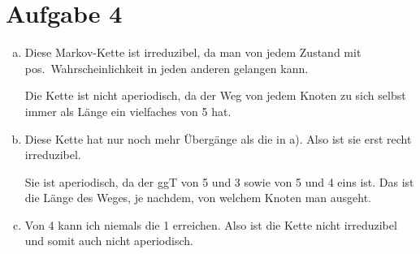 \documentclass[10pt,a4paper,parskip=half]{scrartcl}
\begin{document}
\section*{Aufgabe 4}
\begin{enumerate}[a)]
\item Diese Markov-Kette ist irreduzibel, da man von jedem Zustand mit pos.~Wahrscheinlichkeit in jeden anderen gelangen kann.

Die Kette ist nicht aperiodisch, da der Weg von jedem Knoten zu sich selbst immer als Länge ein vielfaches von 5 hat.
\item
Diese Kette hat nur noch mehr Übergänge als die in a). Also ist sie erst recht irreduzibel.

Sie ist aperiodisch, da der ggT von 5 und 3 sowie von 5 und 4 eins ist. Das ist die Länge des Weges, je nachdem, von welchem Knoten man ausgeht.
\item Von 4 kann ich niemals die 1 erreichen. Also ist die Kette nicht irreduzibel und somit auch nicht aperiodisch.
\end{enumerate}
\end{document}
